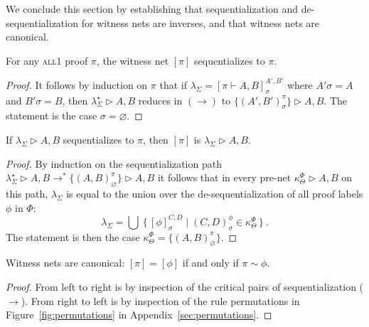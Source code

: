 \documentclass[twoside,a4paper]{article}
\newcommand\all{\textsc{all}}
\newcommand\+{+}
\renewcommand\*{\times}
\newcommand\prf[3]{#1\vdash\!#2,#3}
\newcommand\net[3]{#1\triangleright #2,#3}
\newcommand\deseq[4][\sigma]{[#2]_{#1}^{#3,#4}}
\newcommand\link[3][\sigma]{(#2,#3)_{#1}}
\newcommand\scoal{\rightarrow} %
\begin{document}
We conclude this section by establishing that sequentialization and de-sequentialization for witness nets are inverses, and that witness nets are canonical.

\begin{theorem}
\label{thm:proof->net->proof}
For any \all1 proof $\pi$, the witness net $[\pi]$ sequentializes to $\pi$. 
\end{theorem}

\begin{proof}
It follows by induction on $\pi$ that if $\lambda_\Sigma=\deseq{\prf\pi AB}{A'}{B'}$ where $A'\sigma=A$ and $B'\sigma=B$, then $\net{\lambda^\star_\Sigma}AB$ reduces in $(\scoal)$ to $\net{\{\link{A'}{B'}^\pi\}}AB$. The statement is the case $\sigma=\varnothing$.
\end{proof}

\begin{theorem}
\label{thm:net->proof->net}
If $\net{\lambda_\Sigma}AB$ sequentializes to $\pi$, then $[\pi]$ is $\net{\lambda_\Sigma}AB$. 
\end{theorem}

\begin{proof}
By induction on the sequentialization path 
$\net{\lambda_\Sigma^\star}AB\scoal^*\net{\{\link[\varnothing]AB^\pi\}}AB$
it follows that in every pre-net $\net{\kappa_\Theta^\Phi}AB$ on this path, $\lambda_\Sigma$ is equal to the union over the de-sequentialization of all proof labels $\phi$ in $\Phi$:
\[
	\lambda_\Sigma=\bigcup~\{\,\deseq\phi CD \mid \link CD^\phi \in \kappa_\Theta^\Phi\,\}~.
\]
The statement is then the case $\kappa_\Theta^\Phi=\{\link[\varnothing]AB^\pi\}$.
\end{proof}

\begin{theorem}
Witness nets are canonical: $[\pi]=[\phi]$ if and only if $\pi\sim\phi$.
\end{theorem}

\begin{proof}
From left to right is by inspection of the critical pairs of sequentialization ($\scoal$). From right to left is by inspection of the rule permutations in Figure~\ref{fig:permutations} in Appendix~\ref{sec:permutations}.
\end{proof}
\end{document}
